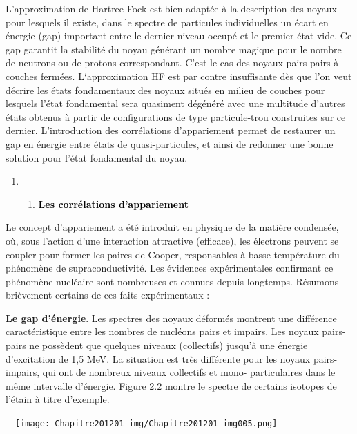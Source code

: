 \documentclass[a4paper]{article}
\begin{document}
L’approximation de Hartree-Fock est bien adaptée à la description des noyaux pour lesquels il existe, dans le spectre de
particules individuelles un écart en énergie ({\textquotedbl}gap{\textquotedbl}) important entre le dernier niveau
occupé et le premier état vide. Ce {\textquotedbl}gap{\textquotedbl} garantit la stabilité du noyau générant un nombre
magique pour le nombre de neutrons ou de protons correspondant. C’est le cas des noyaux pairs-pairs à couches fermées.
L‘approximation HF est par contre insuffisante dès que l’on veut décrire les états fondamentaux des noyaux situés en
milieu de couches pour lesquels l’état fondamental sera quasiment dégénéré avec une multitude d’autres états obtenus à
partir de configurations de type particule-trou construites sur ce dernier. L’introduction des corrélations
d’appariement permet de restaurer un {\textquotedbl}gap{\textquotedbl} en énergie entre états de
{\textquotedbl}quasi-particules{\textquotedbl}, et ainsi de redonner une bonne solution pour l’état fondamental du
noyau.

\begin{enumerate}
\item \begin{enumerate}
\item \textbf{\textcolor{black}{Les corrélations d'appariement}}
\end{enumerate}
\end{enumerate}
Le concept d’appariement a été introduit en physique de la matière condensée, où, sous l’action d’une interaction
attractive (efficace), les électrons peuvent se coupler pour former les paires de Cooper, responsables à basse
température du phénomène de supraconductivité. Les évidences expérimentales confirmant ce phénomène nucléaire sont
nombreuses et connues depuis longtemps. Résumons brièvement certains de ces faits expérimentaux :

\textbf{Le gap d’énergie}. Les spectres des noyaux déformés montrent une différence caractéristique entre les nombres de
nucléons pairs et impairs. Les noyaux pairs-pairs ne possèdent que quelques niveaux (collectifs) jusqu'à une énergie
d'excitation de 1,5 MeV. La situation est très différente pour les noyaux pairs-impairs, qui ont de nombreux niveaux
collectifs et mono- particulaires dans le même intervalle d'énergie. Figure 2.2 montre le spectre de certains isotopes
de l'étain à titre d'exemple.

\ \  \texttt{[image: Chapitre201201-img/Chapitre201201-img005.png]} 
\end{document}
